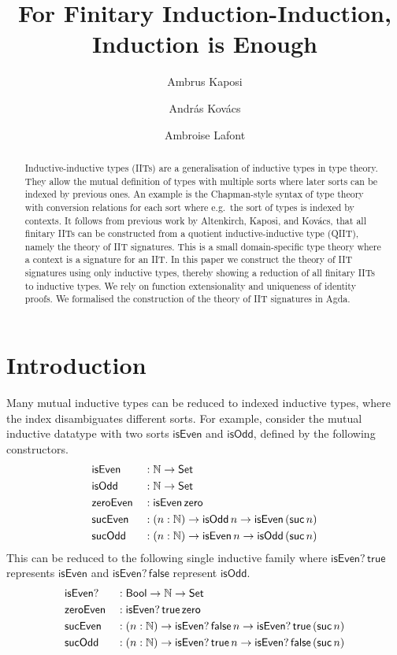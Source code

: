 \documentclass[a4paper,UKenglish,cleveref, autoref]{lipics-v2019}
\title{For Finitary Induction-Induction, \\ Induction is Enough} %
\author{Ambrus Kaposi}{E{\"o}tv{\"o}s Lor{\'a}nd University, Budapest, Hungary}{akaposi@inf.elte.hu}{https://orcid.org/0000-0001-9897-8936}{this author was supported by Thematic Excellence Programme, Industry and Digitization Subprogramme (NRDI Office, 2019) and by the European Union, co-financed by the European Social Fund (EFOP-3.6.2-16-2017-00013, Thematic Fundamental Research Collaborations Grounding Innovation in Informatics and Infocommunication).}%
\author{Andr{\'a}s Kov{\'a}cs}{E{\"o}tv{\"o}s Lor{\'a}nd University, Budapest, Hungary}{kovacsandras@inf.elte.hu}{https://orcid.org/0000-0002-6375-9781}{this author was supported by the European Union, co-financed by the European Social Fund (EFOP-3.6.3-VEKOP-16-2017-00002).}
\author{Ambroise Lafont}{IMT Atlantique, Inria, LS2N CNRS, Nantes, France}{ambroise.lafont@inria.fr}{https://orcid.org/0000-0002-9299-641X}{}
\begin{document}
\maketitle

\begin{abstract}
  Inductive-inductive types (IITs) are a generalisation of inductive types in
  type theory. They allow the mutual definition of types with multiple sorts
  where later sorts can be indexed by previous ones. An example is the
  Chapman-style syntax of type theory with conversion relations for each sort
  where e.g.\ the sort of types is indexed by contexts. It follows from previous
  work by Altenkirch, Kaposi, and Kov{\'a}cs, that all finitary IITs can be constructed from a quotient
  inductive-inductive type (QIIT), namely the theory of IIT signatures. This is
  a small domain-specific type theory where a context is a signature for an
  IIT. In this paper we construct the theory of IIT signatures using only inductive types,
  thereby showing a reduction of all finitary IITs to inductive types.  We rely
  on function extensionality and uniqueness of identity proofs. We formalised
  the construction of the theory of IIT signatures in Agda.
\end{abstract}

\section{Introduction}
\label{sec:intro}

Many mutual inductive types can be reduced to indexed inductive types, where the
index disambiguates different sorts. For example, consider the mutual inductive datatype
with two sorts
$\mathsf{isEven}$ and $\mathsf{isOdd}$, defined by the following
constructors.
\begin{alignat*}{5}
  & \mathsf{isEven} && : \mathbb{N}\rightarrow\mathsf{Set} \\
  & \mathsf{isOdd} && : \mathbb{N}\rightarrow \mathsf{Set} \\
  & \mathsf{zeroEven} && : \mathsf{isEven}\,\mathsf{zero} \\
  & \mathsf{sucEven} && : (n:\mathbb{N})\rightarrow\mathsf{isOdd}\,n\rightarrow\mathsf{isEven}\,(\mathsf{suc}\,n) \\
  & \mathsf{sucOdd} && : (n:\mathbb{N})\rightarrow\mathsf{isEven}\,n\rightarrow\mathsf{isOdd}\,(\mathsf{suc}\,n)
\end{alignat*}
This can be reduced to the following single inductive family where
$\mathsf{isEven?}\,\mathsf{true}$ represents $\mathsf{isEven}$ and
$\mathsf{isEven?}\,\mathsf{false}$ represent $\mathsf{isOdd}$.
\begin{alignat*}{5}
  & \mathsf{isEven?} && : \mathsf{Bool}\rightarrow\mathbb{N}\rightarrow\mathsf{Set} \\
  & \mathsf{zeroEven} && : \mathsf{isEven?}\,\mathsf{true}\,\mathsf{zero} \\
  & \mathsf{sucEven} && : (n:\mathbb{N})\rightarrow\mathsf{isEven?}\,\mathsf{false}\,n\rightarrow\mathsf{isEven?}\,\mathsf{true}\,(\mathsf{suc}\,n) \\
  & \mathsf{sucOdd} && : (n:\mathbb{N})\rightarrow\mathsf{isEven?}\,\mathsf{true}\,n\rightarrow\mathsf{isEven?}\,\mathsf{false}\,(\mathsf{suc}\,n)
\end{alignat*}
\end{document}
